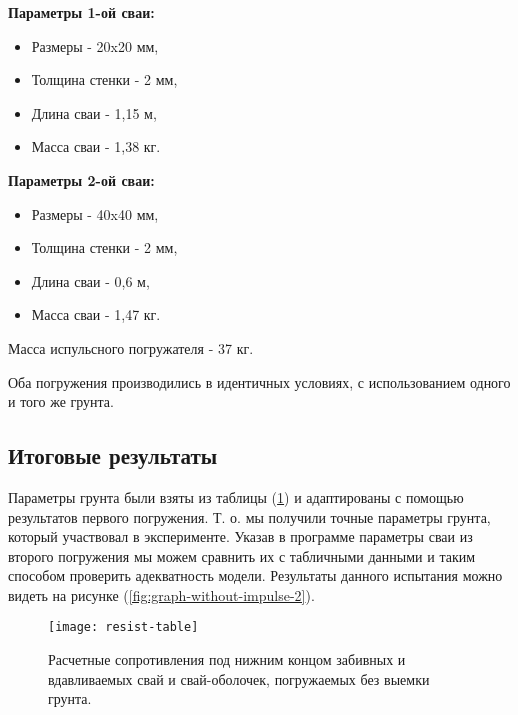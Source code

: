\vspace{1em}

\begin{minipage}{0.5\textwidth}
    \textbf{Параметры 1-ой сваи:}
    \begin{itemize}
        \item Размеры - 20x20 мм,
        \item Толщина стенки - 2 мм,
        \item Длина сваи - 1,15 м,
        \item Масса сваи - 1,38 кг.
    \end{itemize}
\end{minipage}
\hfill
\begin{minipage}{0.5\textwidth}
    \textbf{Параметры 2-ой сваи:}
    \begin{itemize}
        \item Размеры - 40x40 мм,
        \item Толщина стенки - 2 мм,
        \item Длина сваи - 0,6 м,
        \item Масса сваи - 1,47 кг.
    \end{itemize}
\end{minipage}

\noindent Масса испульсного погружателя - 37 кг.

Оба погружения производились в идентичных условиях, с использованием одного и того же грунта.

\subsection{Итоговые результаты}

Параметры грунта были взяты из таблицы (\ref{fig:resist-table}) и адаптированы с помощью результатов первого погружения. Т. о.
мы получили точные параметры грунта, который участвовал в эксперименте. Указав в программе параметры сваи
из второго погружения мы можем сравнить их с табличными данными и таким способом проверить адекватность
модели. Результаты данного испытания можно видеть на рисунке (\ref{fig:graph-without-impulse-2}).

\begin{figure}[ht]
    \centering
    \texttt{[image: resist-table]}
    \caption{Расчетные сопротивления под нижним концом забивных и вдавливаемых свай и свай-оболочек, погружаемых без выемки грунта.}
    \label{fig:resist-table}
\end{figure}


